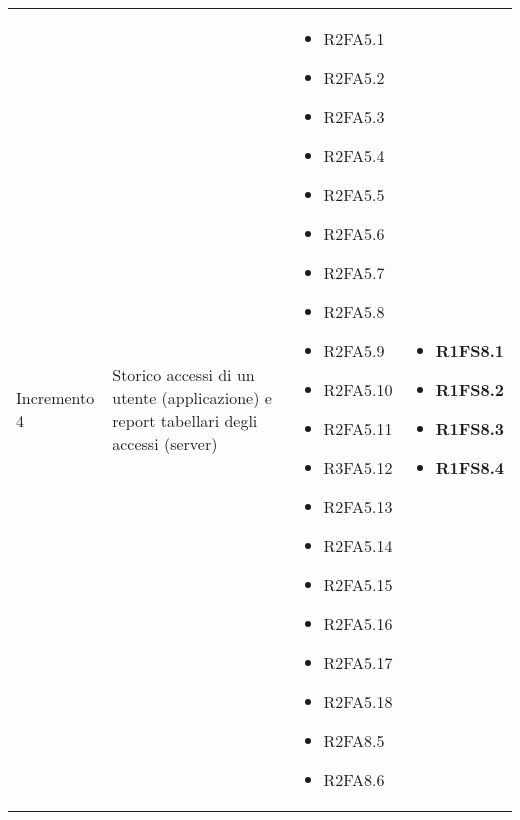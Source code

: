 {\begin{longtable}{C{3cm} C{4cm} C{4cm} C{4cm}}
Incremento 4 & Storico accessi di un utente (applicazione) e report tabellari degli accessi (server) & \begin{itemize}
    \item[ ] R2FA5.1
    \item[ ] R2FA5.2
    \item[ ] R2FA5.3
    \item[ ] R2FA5.4
    \item[ ] R2FA5.5
    \item[ ] R2FA5.6
    \item[ ] R2FA5.7
    \item[ ] R2FA5.8
    \item[ ] R2FA5.9
    \item[ ] R2FA5.10
    \item[ ] R2FA5.11
    \item[ ] R3FA5.12
    \item[ ] R2FA5.13
    \item[ ] R2FA5.14
    \item[ ] R2FA5.15
    \item[ ] R2FA5.16
    \item[ ] R2FA5.17
    \item[ ] R2FA5.18
    \item[ ] R2FA8.5
    \item[ ] R2FA8.6
\end{itemize} & \begin{itemize} 
    \item[ ] \textbf{R1FS8.1}
    \item[ ] \textbf{R1FS8.2}
    \item[ ] \textbf{R1FS8.3}
    \item[ ] \textbf{R1FS8.4}         
\end{itemize}\\


\end{longtable}}
